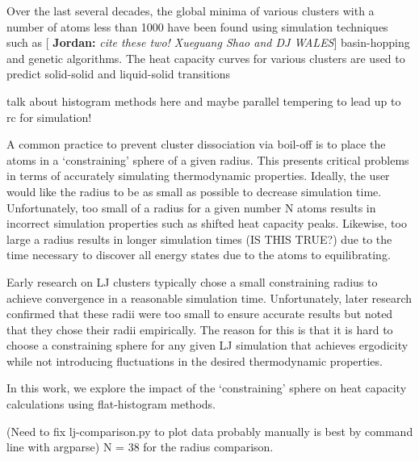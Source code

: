 \documentclass[letterpaper,twocolumn,amsmath,amssymb,pre,aps,10pt]{revtex4-1}
\newcommand{\blue}[1]{{\bf \color{blue} #1}}
\newcommand{\jpsays}[1]{{\color{red} [\blue{Jordan:} \emph{#1}]}}
\begin{document}
Over the last several decades, the global minima of various clusters with a number of atoms less than 1000 have been
found using simulation techniques such as \jpsays{cite these two!  Xueguang Shao and DJ WALES} basin-hopping and genetic algorithms.
The heat capacity curves for various clusters are used to predict solid-solid and liquid-solid transitions



talk about histogram methods here and maybe parallel tempering to lead up to rc for simulation!

A common practice to prevent cluster dissociation via boil-off is to place the atoms in a `constraining'
sphere of a given radius. This presents critical problems in terms of accurately simulating thermodynamic
properties. Ideally, the user would like the radius to be as small as possible to decrease simulation time.
Unfortunately, too small of a radius for a given number N atoms results in incorrect simulation properties
such as shifted heat capacity peaks. Likewise, too large a radius results in longer simulation times (IS THIS TRUE?)
due to the time necessary to discover all energy states due to the atoms to equilibrating.

Early research on LJ clusters typically chose a small constraining radius to achieve convergence in
a reasonable simulation time. Unfortunately, later research confirmed that these radii were too small
to ensure accurate results but noted that they chose their radii empirically. The reason for this is that
it is hard to choose a constraining sphere for any given LJ simulation that achieves ergodicity while not
introducing fluctuations in the desired thermodynamic properties.

In this work, we explore the impact of the `constraining' sphere on heat capacity calculations using flat-histogram
methods.

(Need to fix lj-comparison.py to plot data probably manually is best by command line with argparse)
N = 38 for the radius comparison.

\end{document}

